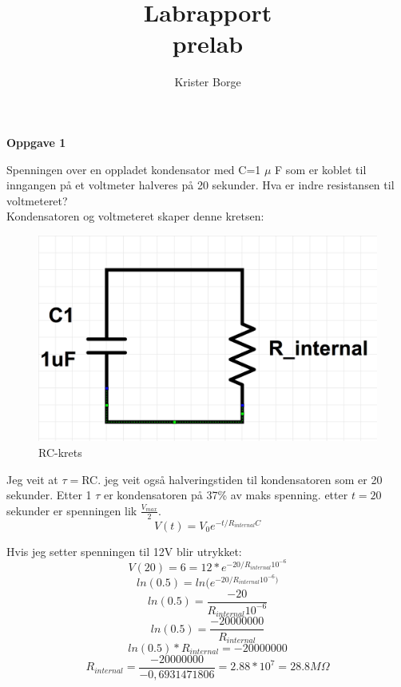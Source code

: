 \documentclass[12pt,a4paper,leqno]{report}
\author{Krister Borge}
\title{Labrapport \\ \small{prelab}}
\begin{document}
\maketitle
\textbf{Oppgave 1}

Spenningen over en oppladet kondensator med C=1 $\mu$ F
som er koblet til inngangen på et voltmeter halveres på 20 sekunder. Hva er indre resistansen til voltmeteret?\\
Kondensatoren og voltmeteret skaper denne kretsen:
\begin{figure}[H]
\caption{RC-krets}
\centering
\includegraphics[width=\textwidth]{RC-cirquit.jpg}
\end{figure}
Jeg veit at $\tau=$RC. jeg veit også halveringstiden til kondensatoren som er 20 sekunder. Etter  1 $\tau$  er kondensatoren på 37\% av maks spenning. etter $t=20$ sekunder er spenningen lik $\frac{V_{max}}{2}$.
\begin{equation}
V(t)=V_0e^{-t/R_{internal}C}
\end{equation}

Hvis jeg setter spenningen til 12V blir utrykket:
\begin{equation}
V(20)=6=12*e^{-20/R_{internal}10^{-6}}
\end{equation}
\begin{equation}
ln(0.5)=ln(e^{-20/R_{internal}10^{-6})}
\end{equation}
\begin{equation}
ln(0.5)=\frac{-20}{R_{internal}10^{-6}}
\end{equation}
\begin{equation}
ln(0.5)=\frac{-20000000}{R_{internal}}
\end{equation}
\begin{equation}
ln(0.5)*R_{internal}=-20000000
\end{equation}
\begin{equation}
R_{internal}=\frac{-20000000}{-0,6931471806}=2.88*10^7=28.8M\Omega
\end{equation}
\end{document}
